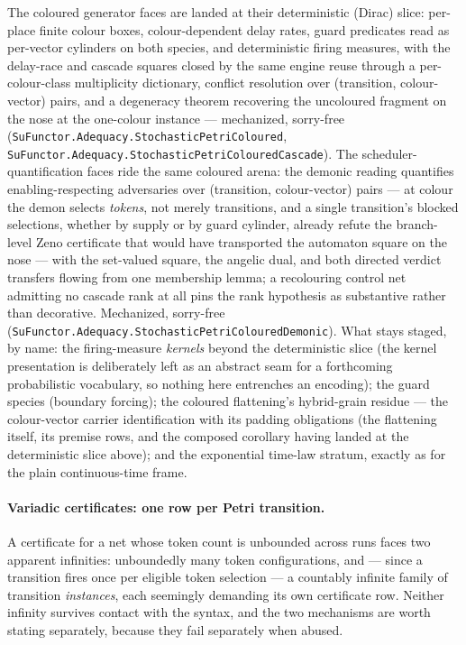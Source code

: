 The coloured generator faces are landed at their deterministic
(Dirac) slice: per-place finite colour boxes, colour-dependent delay
rates, guard predicates read as per-vector cylinders on both species,
and deterministic firing measures, with the delay-race and cascade
squares closed by the same engine reuse through a per-colour-class
multiplicity dictionary, conflict resolution over (transition,
colour-vector) pairs, and a degeneracy theorem recovering the
uncoloured fragment on the nose at the one-colour instance ---
mechanized, sorry-free
(\texttt{SuFunctor.Adequacy.StochasticPetriColoured},
\texttt{SuFunctor.Adequacy.StochasticPetriColouredCascade}).
The scheduler-quantification faces ride the same coloured arena: the
demonic reading quantifies enabling-respecting adversaries over
(transition, colour-vector) pairs --- at colour the demon selects
\emph{tokens}, not merely transitions, and a single transition's
blocked selections, whether by supply or by guard cylinder, already
refute the branch-level Zeno certificate that would have transported
the automaton square on the nose --- with the set-valued square, the
angelic dual, and both directed verdict transfers flowing from one
membership lemma; a recolouring control net admitting no cascade rank
at all pins the rank hypothesis as substantive rather than
decorative.  Mechanized, sorry-free
(\texttt{SuFunctor.Adequacy.StochasticPetriColouredDemonic}).
What stays staged, by name: the firing-measure \emph{kernels} beyond
the deterministic slice (the kernel presentation is deliberately left
as an abstract seam for a forthcoming probabilistic vocabulary, so
nothing here entrenches an encoding); the guard species (boundary
forcing); the coloured flattening's hybrid-grain residue --- the
colour-vector carrier identification with its padding obligations
(the flattening itself, its premise rows, and the composed corollary
having landed at the deterministic slice above); and the exponential
time-law stratum, exactly as for the plain continuous-time frame.

\paragraph{Variadic certificates: one row per Petri transition.}
A certificate for a net whose token count is unbounded across runs
faces two apparent infinities: unboundedly many token
configurations, and --- since a transition fires once per eligible
token selection --- a countably infinite family of transition
\emph{instances}, each seemingly demanding its own certificate row.
Neither infinity survives contact with the syntax, and the two
mechanisms are worth stating separately, because they fail
separately when abused.

